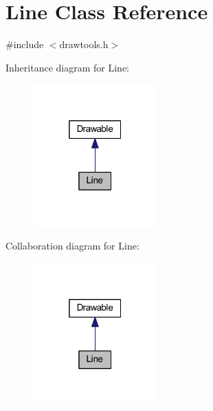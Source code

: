\hypertarget{class_line}{}\section{Line Class Reference}
\label{class_line}


{\ttfamily \#include $<$drawtools.\+h$>$}



Inheritance diagram for Line\+:\nopagebreak
\begin{figure}[H]
\begin{center}
\leavevmode
\includegraphics[width=136pt]{class_line__inherit__graph}
\end{center}
\end{figure}


Collaboration diagram for Line\+:\nopagebreak
\begin{figure}[H]
\begin{center}
\leavevmode
\includegraphics[width=136pt]{class_line__coll__graph}
\end{center}
\end{figure}
